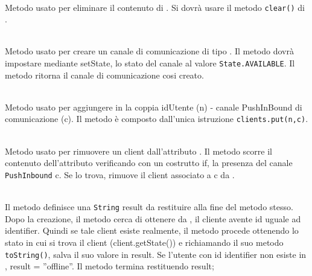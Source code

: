 \begin{description}
	\item{}\\
	Metodo usato per eliminare il contenuto di . Si dovrà usare il metodo \texttt{clear()} di .
	
	\item{}\\
	Metodo usato per creare un canale di comunicazione di tipo . Il metodo dovrà impostare mediante setState, lo stato del canale al valore \verb|State.AVAILABLE|. Il metodo ritorna il canale di comunicazione cosi creato.
	
	\item{}\\
	Metodo usato per aggiungere in  la coppia idUtente (n) - canale PushInBound di comunicazione (c). Il metodo è composto dall'unica istruzione \verb|clients.put(n,c)|.
	
	\item{}\\
	Metodo usato per rimuovere un client dall'attributo . Il metodo scorre il contenuto dell'attributo verificando con un costrutto if, la presenza del canale \texttt{PushInbound} c. Se lo trova, rimuove il client associato a c da .
	
	\item{}\\
	Il metodo definisce una \texttt{String} result da restituire alla fine del metodo stesso. Dopo la creazione, il metodo cerca di ottenere da , il cliente avente id uguale ad identifier. Quindi se tale client esiste realmente, il metodo procede ottenendo lo stato in cui si trova il client (client.getState()) e richiamando il suo metodo \texttt{toString()}, salva il suo valore in result. Se l'utente con id identifier non esiste in , result = ''offline''. Il metodo termina restituendo result;
	

\end{description}
